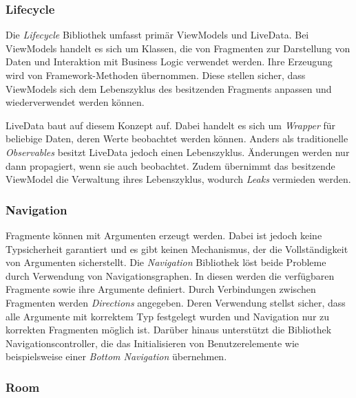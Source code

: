 \documentclass[a4paper, 11pt]{article}
\begin{document}
\subsubsection{Lifecycle}
\label{subsubsec:app:jetpack:lifecycle}
Die \textit{Lifecycle} Bibliothek umfasst primär ViewModels und LiveData.
Bei ViewModels handelt es sich um Klassen, die von Fragmenten zur Darstellung von Daten und Interaktion mit Business Logic verwendet werden.
Ihre Erzeugung wird von Framework-Methoden übernommen.
Diese stellen sicher, dass ViewModels sich dem Lebenszyklus des besitzenden Fragments anpassen und wiederverwendet werden können.

LiveData baut auf diesem Konzept auf.
Dabei handelt es sich um \textit{Wrapper} für beliebige Daten, deren Werte beobachtet werden können.
Anders als traditionelle \textit{Observables} besitzt LiveData jedoch einen Lebenszyklus.
Änderungen werden nur dann propagiert, wenn sie auch beobachtet.
Zudem übernimmt das besitzende ViewModel die Verwaltung ihres Lebenszyklus, wodurch \textit{Leaks} vermieden werden.

\subsubsection{Navigation}
\label{subsubsec:app:jetpack:navigation}
Fragmente können mit Argumenten erzeugt werden.
Dabei ist jedoch keine Typsicherheit garantiert und es gibt keinen Mechanismus, der die Vollständigkeit von Argumenten sicherstellt.
Die \textit{Navigation} Bibliothek löst beide Probleme durch Verwendung von Navigationsgraphen.
In diesen werden die verfügbaren Fragmente sowie ihre Argumente definiert.
Durch Verbindungen zwischen Fragmenten werden \textit{Directions} angegeben.
Deren Verwendung stellst sicher, dass alle Argumente mit korrektem Typ festgelegt wurden und Navigation nur zu korrekten Fragmenten möglich ist.
Darüber hinaus unterstützt die Bibliothek Navigationscontroller, die das Initialisieren von Benutzerelemente wie beispielsweise einer \textit{Bottom Navigation} übernehmen. 

\subsubsection{Room}
\label{subsubsec:app:jetpack:room}
\end{document}
